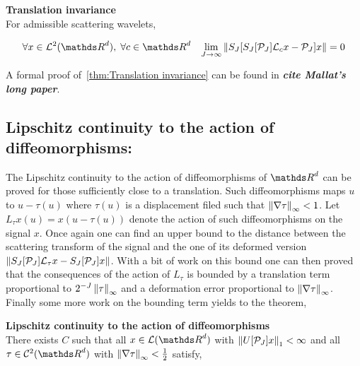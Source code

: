\documentclass[a4paper,11pt]{report}
\begin{document}
{			\begin{thm} \textbf{Translation invariance}\\
				For admissible scattering wavelets,
				
				\begin{equation}
					\forall x \in \mathcal{L}^{2}(\dsR^{d}), \; \forall c \in \dsR^{d} \;\;\; \lim_{J \rightarrow \infty} \norm{S_{J}[ S_{J}[\mathcal{P}_{J}]\mathcal{L}_{c}x - \mathcal{P}_{J}]x} = 0
					\label{eq:Tranlation invariance}
				\end{equation}
				\label{thm:Translation invariance}
			  
			\end{thm}

			\begin{note}
			  A formal proof of~\ref{thm:Translation invariance} can be found in \textbf{\textit{cite Mallat's long paper}}.
			\end{note}
	
		\subsection{Lipschitz continuity to the action of diffeomorphisms:}
			\label{subsec:ST/Pties/Lipschitz continuity}
			
			The Lipschitz continuity to the action of diffeomorphisms of $\dsR^{d}$ can be proved for those sufficiently close to a translation. Such diffeomorphisms maps $u$ to $u-\tau(u)$ where $\tau(u)$ is a displacement filed such that $\left\lVert \nabla \tau \right\rVert_{\infty} < 1$. Let $L_{\tau}x(u)=x(u-\tau(u))$ denote the action of such diffeomorphisms on the signal $x$. Once again one can find an upper bound to the distance between the scattering transform of the signal and the one of its deformed version $\left\lVert S_{J}[\mathcal{P}_{J}]\mathcal{L}_{\tau}x - S_{J}[\mathcal{P}_{J}]x \right\rVert$. With a bit of work on this bound one can then proved that the consequences of the action of $L_{\tau}$ is bounded by a translation term proportional to $2^{-J} \left\lVert \tau \right\rVert_{\infty}$ and a deformation error proportional to $\left\lVert \nabla \tau \right\rVert_{\infty}$. Finally some more work on the bounding term yields to the theorem,
			
			\begin{thm} \textbf{Lipschitz continuity to the action of diffeomorphisms} \\
			  There exists $C$ such that all $x \in \mathcal{L}(\dsR^{d})$ with $\left\lVert U[\mathcal{P}_{J}]x \right\rVert_{1} < \infty$ and all $\tau \in \mathcal{C}^{2}(\dsR^{d})$ with $\left\lVert \nabla \tau \right\rVert_{\infty} < \frac{1}{2}$ satisfy,
			  

\end{thm}}
\end{document}
